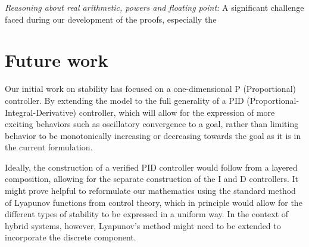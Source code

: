 \documentclass{sigplanconf}
\begin{document}



\emph{Reasoning about real arithmetic, powers and floating point: }
A significant challenge faced during our development of the proofs, especially the

\section{Future work}

Our initial work on stability has focused on a one-dimensional P (Proportional) controller. By extending the model to the full generality of a PID (Proportional-Integral-Derivative) controller, which will allow for the expression of more exciting behaviors such as oscillatory convergence to a goal, rather than limiting behavior to be monotonically increasing or decreasing towards the goal as it is in the current formulation.

Ideally, the construction of a verified PID controller would follow from a layered composition, allowing for the separate construction of the I and D controllers. It might prove helpful to reformulate our mathematics using the standard method of Lyapunov functions from control theory, which in principle would allow for the different types of stability to be expressed in a uniform way. In the context of hybrid systems, however, Lyapunov's method might need to be extended to incorporate the discrete component.





\end{document}
